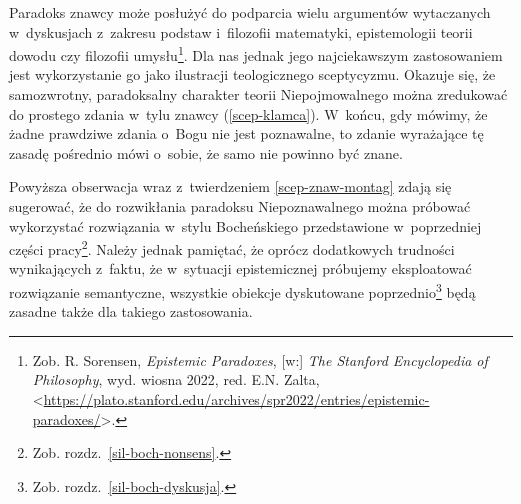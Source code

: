 Paradoks znawcy może posłużyć do podparcia wielu argumentów wytaczanych w~dyskusjach z~zakresu podstaw i~filozofii matematyki, epistemologii teorii dowodu czy filozofii umysłu\footnote{Zob. R. Sorensen, \textit{Epistemic Paradoxes}, [w:] \textit{The Stanford Encyclopedia of Philosophy}, wyd. wiosna 2022, red. E.N. Zalta, <\url{https://plato.stanford.edu/archives/spr2022/entries/epistemic-paradoxes/}>.}. Dla nas jednak jego najciekawszym zastosowaniem jest wykorzystanie go jako ilustracji teologicznego sceptycyzmu. Okazuje się, że samozwrotny, paradoksalny charakter teorii Niepojmowalnego można zredukować do prostego zdania w~tylu znawcy (\ref{scep-klamca}). W~końcu, gdy mówimy, że żadne prawdziwe zdania o~Bogu nie jest poznawalne, to zdanie wyrażające tę zasadę pośrednio mówi o~sobie, że samo nie powinno być znane.

Powyższa obserwacja wraz z~twierdzeniem \ref{scep-znaw-montag} zdają się sugerować, że do rozwikłania paradoksu Niepoznawalnego można próbować wykorzystać rozwiązania w~stylu Bocheńskiego przedstawione w~poprzedniej części pracy\footnote{Zob. rozdz.~\ref{sil-boch-nonsens}.}. Należy jednak pamiętać, że oprócz dodatkowych trudności wynikających z~faktu, że w~sytuacji epistemicznej próbujemy eksploatować rozwiązanie semantyczne, wszystkie obiekcje dyskutowane poprzednio\footnote{Zob. rozdz.~\ref{sil-boch-dyskusja}.} będą zasadne także dla takiego zastosowania.



